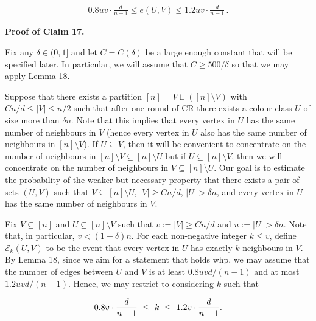 \documentclass[10pt,a4paper]{article}
\begin{document}
\[\begin{gathered}
0.8uv\cdot\frac{d}{n-1}\leq e(U,V)\leq 1.2uv\cdot\frac{d}{n-1}\,.
\end{gathered}\]







\par\medskip\noindent\textbf{
\textbf{Proof of Claim 17}.}\par




Fix any $\delta\in(0,1]$ and let $C=C(\delta)$ be a large enough constant that will be specified later. In particular, we will assume that $C\geq 500/\delta$ so that we may apply Lemma 18.\par




Suppose that there exists a partition $[n]=V\sqcup([n]\setminus V)$ with $Cn/d\leq|V|\leq n/2$ such that after one round of CR there exists a colour class $U$ of size more than $\delta n$. Note that this implies that every vertex in $U$ has the same number of neighbours in $V$ (hence every vertex in $U$ also has the same number of neighbours in $[n]\setminus V$). If $U\subseteq V$, then it will be convenient to concentrate on the number of neighbours in $[n]\setminus V\subseteq[n]\setminus U$ but if $U\subseteq[n]\setminus V$, then we will concentrate on the number of neighbours in $V\subseteq[n]\setminus U$. Our goal is to estimate the probability of the weaker but necessary property that there exists a pair of sets $(U,V)$ such that $V\subseteq[n]\setminus U$, $|V|\geq Cn/d$, $|U|>\delta n$, and every vertex in $U$ has the same number of neighbours in $V$.\par




Fix $V\subseteq[n]$ and $U\subseteq[n]\setminus V$ such that $v:=|V|\geq Cn/d$ and $u:=|U|>\delta n$. Note that, in particular, $v<(1-\delta)n$. For each non-negative integer $k\leq v$, define $\mathcal{E}_{k}(U,V)$ to be the event that every vertex in $U$ has exactly $k$ neighbours in $V$. By Lemma 18, since we aim for a statement that holds whp, we may assume that the number of edges between $U$ and $V$ is at least $0.8uvd/(n-1)$ and at most $1.2uvd/(n-1)$. Hence, we may restrict to considering $k$ such that\par


\[\begin{gathered}
0.8v\cdot\frac{d}{n-1}\nobreak\ \leq\nobreak\ k\nobreak\ \leq\nobreak\ 1.2v\cdot\frac{d}{n-1}.
\end{gathered}\]
\end{document}
